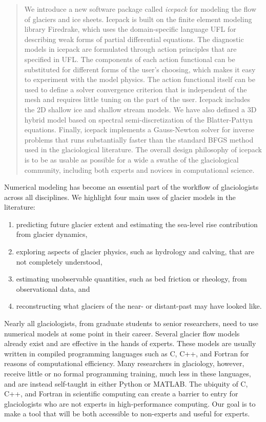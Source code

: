 \documentclass[journal abbreviation, manuscript]{copernicus}
\begin{document}
\begin{abstract}
We introduce a new software package called \emph{icepack} for modeling the flow of glaciers and ice sheets.
Icepack is built on the finite element modeling library Firedrake, which uses the domain-specific language UFL for describing weak forms of partial differential equations.
The diagnostic models in icepack are formulated through action principles that are specified in UFL.
The components of each action functional can be substituted for different forms of the user's choosing, which makes it easy to experiment with the model physics.
The action functional itself can be used to define a solver convergence criterion that is independent of the mesh and requires little tuning on the part of the user.
Icepack includes the 2D shallow ice and shallow stream models.
We have also defined a 3D hybrid model based on spectral semi-discretization of the Blatter-Pattyn equations.
Finally, icepack implements a Gauss-Newton solver for inverse problems that runs substantially faster than the standard BFGS method used in the glaciological literature.
The overall design philosophy of icepack is to be as usable as possible for a wide a swathe of the glaciological community, including both experts and novices in computational science.
\end{abstract}




\introduction  %

Numerical modeling has become an essential part of the workflow of glaciologists across all disciplines.
We highlight four main uses of glacier models in the literature:
\begin{enumerate}
    \item predicting future glacier extent and estimating the sea-level rise contribution from glacier dynamics,
    \item exploring aspects of glacier physics, such as hydrology and calving, that are not completely understood,
    \item estimating unobservable quantities, such as bed friction or rheology, from observational data, and
    \item reconstructing what glaciers of the near- or distant-past may have looked like.
\end{enumerate}
Nearly all glaciologists, from graduate students to senior researchers, need to use numerical models at some point in their career.
Several glacier flow models already exist and are effective in the hands of experts.
These models are usually written in compiled programming languages such as C, C++, and Fortran for reasons of computational efficiency.
Many researchers in glaciology, however, receive little or no formal programming training, much less in these languages, and are instead self-taught in either Python or MATLAB.
The ubiquity of C, C++, and Fortran in scientific computing can create a barrier to entry for glaciologists who are not experts in high-performance computing.
Our goal is to make a tool that will be both accessible to non-experts and useful for experts.
\end{document}
